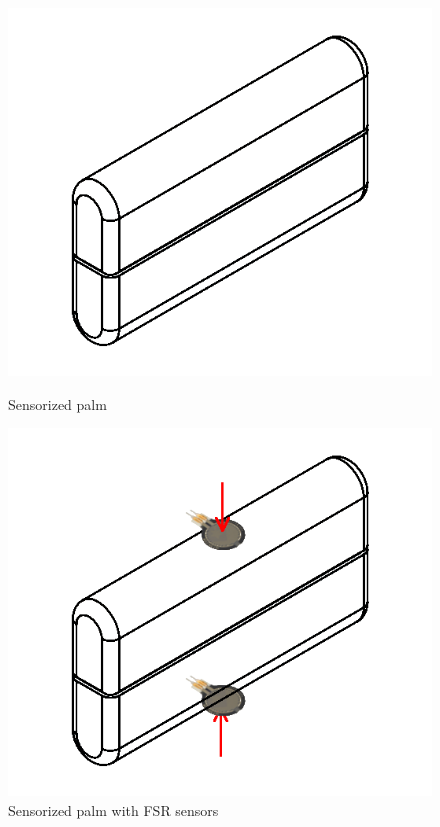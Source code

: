 \begin{figure}[h]
  \centering
  \begin{minipage}[b]{0.4\textwidth}
    \includegraphics[width=\textwidth]{Figure/dummipalm.png}
    \caption{Sensorized palm}
  \label{fig:dummi}
  \end{minipage}
  \hfill
  \begin{minipage}[b]{0.4\textwidth}
    \includegraphics[width=\textwidth]{Figure/dummipalmfsr.png}
    \caption{Sensorized palm with FSR sensors}
    \label{fig:dummifsr}
  \end{minipage}
\end{figure}



